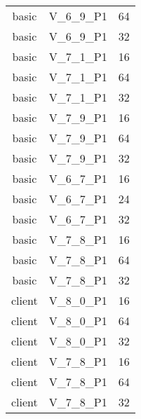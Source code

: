 \begin{longtable}{|c|c|c|}
            basic & V\_6\_9\_P1 & 64 \\
            basic & V\_6\_9\_P1 & 32 \\
            basic & V\_7\_1\_P1 & 16 \\
            basic & V\_7\_1\_P1 & 64 \\
            basic & V\_7\_1\_P1 & 32 \\
            basic & V\_7\_9\_P1 & 16 \\
            basic & V\_7\_9\_P1 & 64 \\
            basic & V\_7\_9\_P1 & 32 \\
            basic & V\_6\_7\_P1 & 16 \\
            basic & V\_6\_7\_P1 & 24 \\
            basic & V\_6\_7\_P1 & 32 \\
            basic & V\_7\_8\_P1 & 16 \\
            basic & V\_7\_8\_P1 & 64 \\
            basic & V\_7\_8\_P1 & 32 \\
            client & V\_8\_0\_P1 & 16 \\
            client & V\_8\_0\_P1 & 64 \\
            client & V\_8\_0\_P1 & 32 \\
            client & V\_7\_8\_P1 & 16 \\
            client & V\_7\_8\_P1 & 64 \\
            client & V\_7\_8\_P1 & 32 \\
        \end{longtable}

